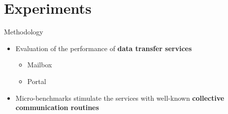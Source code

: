 \section{Experiments}

	\begin{frame}[fragile]{Methodology}
		\begin{itemize}
			\item Evaluation of the performance of \textbf{data transfer services}
			\begin{itemize}
				\item Mailbox
				\item Portal
			\end{itemize}
		\end{itemize}

		\begin{itemize}
			\item Micro-benchmarks stimulate the services with well-known \textbf{collective communication routines}
		\end{itemize}

	\end{frame}

